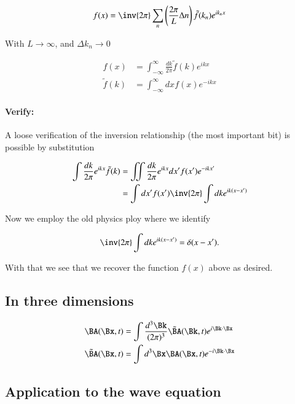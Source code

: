 \begin{equation}\label{eqn:relativisticElectrodynamicsL15:370}
f(x) = \inv{2\pi} \sum_n \left( \frac{2\pi}{L} \Delta n \right) \tilde{f}(k_n) e^{i k_n x}
\end{equation}

With $L \rightarrow \infty$, and $\Delta k_n \rightarrow 0$

\begin{align}\label{eqn:relativisticElectrodynamicsL15:390}
f(x) &= \int_{-\infty}^\infty \frac{dk}{2\pi} \tilde{f}(k) e^{i k x} \\
\tilde{f}(k) &= \int_{-\infty}^\infty dx f(x) e^{-i k x}
\end{align}

\paragraph{Verify:}

A loose verification of the inversion relationship (the most important bit) is possible by substitution

\begin{align*}
\int \frac{dk}{2\pi} e^{i k x} \tilde{f}(k) 
&= 
\iint \frac{dk}{2\pi} e^{i k x} dx' f(x') e^{-i k x'} \\
&= 
\int dx' f(x') \inv{2\pi} \int dk e^{i k (x - x')}
\end{align*}

Now we employ the old physics ploy where we identify

\begin{equation}\label{eqn:relativisticElectrodynamicsL15:820}
\inv{2\pi} \int dk e^{i k (x - x')} = \delta(x - x').
\end{equation}

With that we see that we recover the function $f(x)$ above as desired.

\subsection{In three dimensions}

\begin{align}\label{eqn:relativisticElectrodynamicsL15:470}
\BA(\Bx, t) &= \int 
\frac{d^3 \Bk}{(2\pi)^3} 
\tilde{\BA}(\Bk, t) e^{i \Bk \cdot \Bx} \\
\tilde{\BA}(\Bx, t) &= \int d^3 \Bx \BA(\Bx, t) e^{-i \Bk \cdot \Bx}
\end{align}

\subsection{Application to the wave equation}

